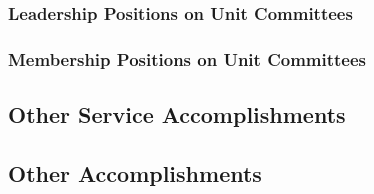 \subsubsection{Leadership Positions on Unit Committees}

\subsubsection{Membership Positions on Unit Committees}

\subsection{Other Service Accomplishments}

\subsection{Other Accomplishments}



